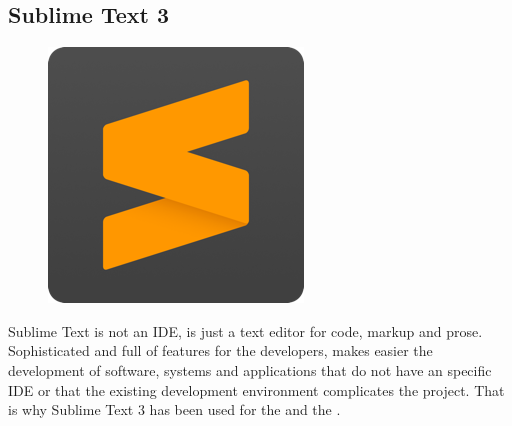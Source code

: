 \subsection*{Sublime Text 3\cite{sublimetext}}

\begin{figure}[H]
\includegraphics[scale=0.1]{resources/sublime-logo.png}
\end{figure}

Sublime Text is not an IDE, is just a text editor for code, markup and prose. Sophisticated and full of features for the developers, makes easier the development of software, systems and applications that do not have an specific IDE or that the existing development environment complicates the project. That is why Sublime Text 3 has been used for the  and the .



